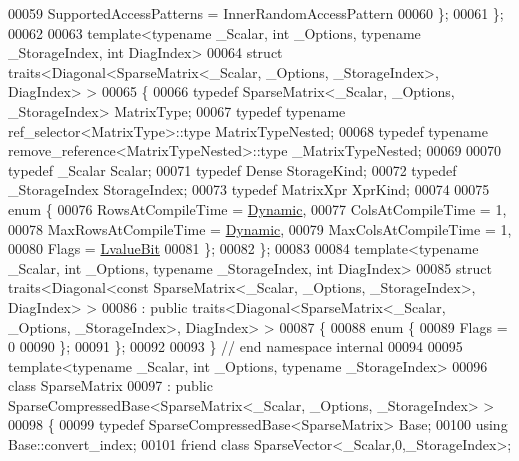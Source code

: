 \begin{DoxyCode}
00059     SupportedAccessPatterns = InnerRandomAccessPattern
00060   \};
00061 \};
00062 
00063 \textcolor{keyword}{template}<\textcolor{keyword}{typename} \_Scalar, \textcolor{keywordtype}{int} \_Options, \textcolor{keyword}{typename} \_StorageIndex, \textcolor{keywordtype}{int} DiagIndex>
00064 \textcolor{keyword}{struct }traits<Diagonal<SparseMatrix<\_Scalar, \_Options, \_StorageIndex>, DiagIndex> >
00065 \{
00066   \textcolor{keyword}{typedef} SparseMatrix<\_Scalar, \_Options, \_StorageIndex> MatrixType;
00067   \textcolor{keyword}{typedef} \textcolor{keyword}{typename} ref\_selector<MatrixType>::type MatrixTypeNested;
00068   \textcolor{keyword}{typedef} \textcolor{keyword}{typename} remove\_reference<MatrixTypeNested>::type \_MatrixTypeNested;
00069 
00070   \textcolor{keyword}{typedef} \_Scalar Scalar;
00071   \textcolor{keyword}{typedef} Dense StorageKind;
00072   \textcolor{keyword}{typedef} \_StorageIndex StorageIndex;
00073   \textcolor{keyword}{typedef} MatrixXpr XprKind;
00074 
00075   \textcolor{keyword}{enum} \{
00076     RowsAtCompileTime = \hyperlink{namespace_eigen_ad81fa7195215a0ce30017dfac309f0b2}{Dynamic},
00077     ColsAtCompileTime = 1,
00078     MaxRowsAtCompileTime = \hyperlink{namespace_eigen_ad81fa7195215a0ce30017dfac309f0b2}{Dynamic},
00079     MaxColsAtCompileTime = 1,
00080     Flags = \hyperlink{group__flags_gae2c323957f20dfdc6cb8f44428eaec1a}{LvalueBit}
00081   \};
00082 \};
00083 
00084 \textcolor{keyword}{template}<\textcolor{keyword}{typename} \_Scalar, \textcolor{keywordtype}{int} \_Options, \textcolor{keyword}{typename} \_StorageIndex, \textcolor{keywordtype}{int} DiagIndex>
00085 \textcolor{keyword}{struct }traits<Diagonal<const SparseMatrix<\_Scalar, \_Options, \_StorageIndex>, DiagIndex> >
00086  : \textcolor{keyword}{public} traits<Diagonal<SparseMatrix<\_Scalar, \_Options, \_StorageIndex>, DiagIndex> >
00087 \{
00088   \textcolor{keyword}{enum} \{
00089     Flags = 0
00090   \};
00091 \};
00092 
00093 \} \textcolor{comment}{// end namespace internal}
00094 
00095 \textcolor{keyword}{template}<\textcolor{keyword}{typename} \_Scalar, \textcolor{keywordtype}{int} \_Options, \textcolor{keyword}{typename} \_StorageIndex>
00096 \textcolor{keyword}{class }SparseMatrix
00097   : \textcolor{keyword}{public} SparseCompressedBase<SparseMatrix<\_Scalar, \_Options, \_StorageIndex> >
00098 \{
00099     \textcolor{keyword}{typedef} SparseCompressedBase<SparseMatrix> Base;
00100     \textcolor{keyword}{using} Base::convert\_index;
00101     \textcolor{keyword}{friend} \textcolor{keyword}{class }SparseVector<\_Scalar,0,\_StorageIndex>;

\end{DoxyCode}
